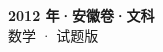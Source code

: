 \documentclass[zihao=-4, a4paper]{ctexart}
\begin{document}
\begin{center}
  {\Large\bfseries 2012 年·安徽卷·文科}\\[4pt]
  {\large 数学 · 试题版}
\end{center}
\medskip
{}

\end{document}
